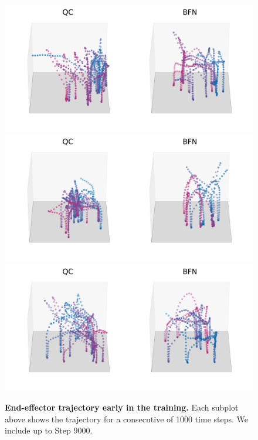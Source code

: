 \begin{figure}[H]
\includegraphics[width=0.32\linewidth]{figures/viz/traj_viz_comb_6_simplified.pdf}
\includegraphics[width=0.32\linewidth]{figures/viz/traj_viz_comb_7_simplified.pdf}
\includegraphics[width=0.32\linewidth]{figures/viz/traj_viz_comb_8_simplified.pdf}
\caption{\textbf{End-effector trajectory early in the training.} Each subplot above shows the trajectory for a consecutive of 1000 time steps. We include up to Step 9000.}
\label{fig:traj-viz-early}
\end{figure}


